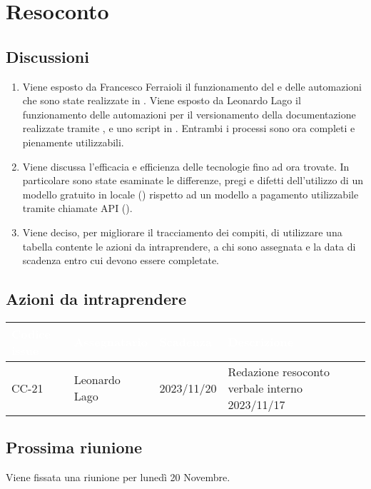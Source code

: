 \section{Resoconto} \label{sec:resoconto}
\subsection{Discussioni} \label{subsec:resdiscussione}
\begin{enumerate}
    \item Viene esposto da Francesco Ferraioli il funzionamento del  e delle automazioni che sono state realizzate in .  Viene esposto da Leonardo Lago il funzionamento delle automazioni per il versionamento della documentazione realizzate tramite ,  e uno script in . Entrambi i processi sono ora completi e pienamente utilizzabili.
    \item Viene discussa l'efficacia e efficienza delle tecnologie fino ad ora trovate. In particolare sono state esaminate le differenze, pregi e difetti dell'utilizzo di un modello  gratuito in locale () rispetto ad un modello a pagamento utilizzabile tramite chiamate API ().
    \item Viene deciso, per migliorare il tracciamento dei compiti, di utilizzare una tabella contente le azioni da intraprendere, a chi sono assegnata e la data di scadenza entro cui devono essere completate.
\end{enumerate}

\subsection{Azioni da intraprendere}
{
    \setlength{\tabcolsep}{10pt}
    \renewcommand{\arraystretch}{1.5}
    \begin{tabularx}{\textwidth}{| l | l | l | X |}
         \hline
         \rowcolor{headerrow}\textbf{\textcolor{white}{Codice issue}} & \textbf{\textcolor{white}{Assegnatario}} & \textbf{\textcolor{white}{Scadenza}} & \textbf{\textcolor{white}{Descrizione}} \\
         \hline
         CC-21 & Leonardo Lago & 2023/11/20 & Redazione resoconto verbale interno 2023/11/17 \\
         \hline
    \end{tabularx}
}

\subsection{Prossima riunione} \label{subsec:riunione}
Viene fissata una riunione per lunedì 20 Novembre.
